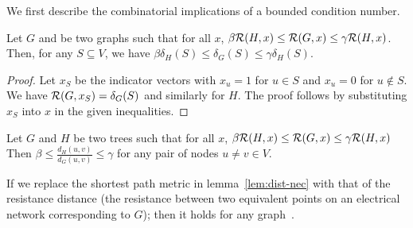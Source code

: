 We first describe the combinatorial implications of a bounded condition number. 

\begin{lemma} [cuts] \label{lem:cut-nec}
  Let $G$ and be two graphs such that for all $x$,   
  $\beta {\cal R}(H,x) \leq {\cal R}(G,x) \leq \gamma {\cal R}(H,x)$.
  Then, for any $S\subseteq V$, we have
  $\beta \delta_H(S) \leq \delta_G(S) \leq \gamma \delta_H (S)$.
\end{lemma}
%
\begin{proof}
  Let $x_S$ be the indicator vectors with $x_u=1$ for $u\in S$
  and $x_u=0$ for $u \not \in S$. We have ${\cal R}(G,x_S) = \delta_G(S)$ and similarly for $H$. 
  The proof follows by  substituting  $x_S$ into $x$ in the given inequalities. 
\end{proof}
%


%
\begin{lemma} [distances] \label{lem:dist-nec}%
  Let $G$ and $H$ be two trees such that for all $x$,   
  $\beta {\cal R}(H,x) \leq {\cal R}(G,x) \leq \gamma {\cal R}(H,x)$
  Then
  $\beta \le \frac{d_H(u,v)}{d_G(u,v)} \le \gamma$ for any pair of
  nodes $u\neq v \in V$.
\end{lemma}
%
\begin{remark}
  If we replace the shortest path metric in lemma~\ref{lem:dist-nec} with
  that of the resistance distance (the resistance between two
  equivalent points on an electrical network corresponding to $G$);
  then it holds for any graph~\cite{doylesnell00}.
\end{remark}
%
